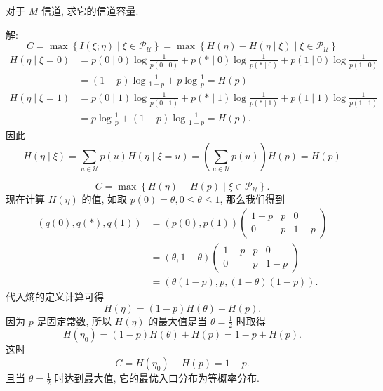 \begin{example}
 对于 $ M $ 信道, 求它的信道容量.
 
解:$$C=\max \left\{I(\xi ; \eta) \mid \xi \in \mathscr{P}_{\mathscr{U}}\right\}=\max \left\{H(\eta)-H(\eta \mid \xi) \mid \xi \in \mathscr{P}_{\mathscr{U}}\right\}$$
$$
\begin{aligned}
H(\eta \mid \xi=0)&=p(0 \mid 0) \log \frac{1}{p(0 \mid 0)}+p(* \mid 0) \log \frac{1}{p(* \mid 0)}+p(1 \mid 0) \log \frac{1}{p(1 \mid 0)} \\
&=(1-p) \log \frac{1}{1-p}+p \log \frac{1}{p}=H(p) \\
H(\eta \mid \xi=1)&=p(0 \mid 1) \log \frac{1}{p(0 \mid 1)}+p(* \mid 1) \log \frac{1}{p(* \mid 1)}+p(1 \mid 1) \log \frac{1}{p(1 \mid 1)} \\
&=p \log \frac{1}{p}+(1-p) \log \frac{1}{1-p}=H(p) .
\end{aligned}
$$
因此
$$
H(\eta \mid \xi)=\sum_{u \in \mathscr{U}} p(u) H(\eta \mid \xi=u)=\left(\sum_{u \in \mathscr{U}} p(u)\right) H(p)=H(p) $$

$$C=\max \left\{H(\eta)-H(p) \mid \xi \in \mathscr{P}_{\mathscr{U}}\right\} .
$$
现在计算 $ H(\eta) $ 的值, 如取 $ p(0)=\theta, 0 \leq \theta \leq 1 $, 那么我们得到
$$
\begin{aligned}
(q(0), q(*), q(1)) & =(p(0), p(1))\left(\begin{array}{ccc}
1-p & p & 0 \\
0 & p & 1-p
\end{array}\right) \\
& =(\theta, 1-\theta)\left(\begin{array}{ccc}
1-p & p & 0 \\
0 & p & 1-p
\end{array}\right) \\
& =(\theta(1-p), p,(1-\theta)(1-p)) .
\end{aligned}
$$
代入熵的定义计算可得
$$
H(\eta)=(1-p) H(\theta)+H(p) .
$$
因为 $ p $ 是固定常数, 所以 $ H(\eta) $ 的最大值是当 $ \theta=\frac{1}{2} $ 时取得
$$
H\left(\eta_{0}\right)=(1-p) H(\theta)+H(p)=1-p+H(p) .
$$
这时
$$
C=H\left(\eta_{0}\right)-H(p)=1-p .
$$
且当 $ \theta=\frac{1}{2} $ 时达到最大值, 它的最优入口分布为等概率分布.
\end{example}



